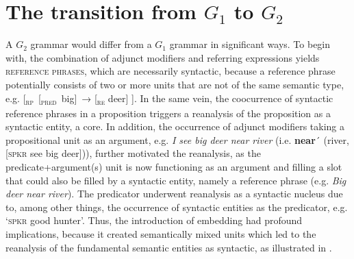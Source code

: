 \documentclass[output=paper,colorlinks,citecolor=brown]{langscibook}
\begin{document}
\section{The transition from $G_1$ to $G_2$}\label{sec:vanvalin:5}

A $G_2$ grammar would differ from a $G_1$ grammar in significant ways.  To begin with, the combination of adjunct modifiers and referring expressions yields \textsc{reference phrases}, which are necessarily syntactic, because a reference phrase potentially consists of two or more units that are not of the same semantic type, e.g. [\textsubscript{\scshape rp}~[\textsubscript{\scshape pred}~big]~→ [\textsubscript{\scshape re} deer] ].  In the same vein, the coocurrence of syntactic reference phrases in a proposition triggers a reanalysis of the proposition as a syntactic entity, a core.  In addition, the occurrence of adjunct modifiers taking a propositional unit as an argument, e.g. \textit{I see big deer near river} (i.e. \textbf{near}´ (river, [\textsc{spkr} see big deer])), further motivated the reanalysis, as the predicate+argument(s) unit is now functioning as an argument and filling a slot that could also be filled by a syntactic entity, namely a reference phrase (e.g. \textit{Big deer near river}).  The predicator underwent reanalysis as a syntactic nucleus due to, among other things, the occurrence of syntactic entities as the predicator, e.g. ‘\textsc{spkr} good hunter’.  Thus, the introduction of embedding had profound implications, because it created semantically mixed units which led to the reanalysis of the fundamental semantic entities as syntactic, as illustrated in .
\end{document}
